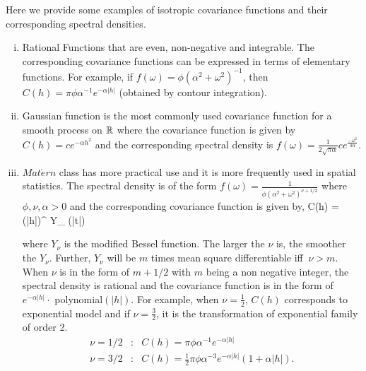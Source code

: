 Here we provide some examples of isotropic covariance functions and their corresponding spectral densities.
\begin{enumerate}[(i)]
	\item Rational Functions that are even,  non-negative and integrable. The corresponding covariance functions can be expressed in terms of elementary functions. For example, if $f(\omega) =\phi (\alpha^2+\omega^2)^{-1}$, then $C(h) = \pi\phi\alpha^{-1}e^{-\alpha|h|}$ (obtained by contour integration).
	
	\item Gaussian \cov function is the most commonly used covariance function for a smooth process on $\mathbb{R}$ where the covariance function is given by $C(h)=ce^{-\alpha h^2}$ and the corresponding spectral density is $ f(\omega) = \frac{1}{2\sqrt{\pi\alpha}}c e^{\frac{-\omega^2}{4\alpha}}$.

	
	\item $Mat\acute{e}rn$ class has more practical use and it is more frequently used in spatial statistics. The spectral density is of the form $f(\omega) =\frac{1}{\phi(\alpha^2+\omega^2)^{\nu+1/2}}$ where $\phi,\nu,\alpha>0$ and the corresponding covariance function is given by,
	      \beq
	      C(h) =  (\alpha|h|)^{\nu} Y_{\nu} (\alpha|t|)
	      \eeq
	
	      where $Y_{\nu}$ is the modified Bessel function. The larger the $\nu$ is, the smoother the $Y_{\nu}$. Further, $Y_{\nu}$ will be $m$ times mean square differentiable iff $\ \nu>m$. When $\nu$ is in the form of $m+1/2$ with $m$ being a non negative integer, the spectral density is rational and the covariance function is in the form of $e^{-\alpha|h|}\cdot$ polynomial$(|h|)$. For example, when $\nu=\frac{1}{2}$, $C(h)$ corresponds to exponential model and if $\nu=\frac{3}{2}$, it is the transformation of exponential family of order 2.
	      \begin{eqnarray*}
	      	\nu = 1/2 &:& C(h) = \pi\phi\alpha^{-1}e^{-\alpha|h|}\\
	      	\nu = 3/2 &:& C(h) = \frac{1}{2}\pi\phi\alpha^{-3}e^{-\alpha|h|}(1+\alpha|h|).\\
	      \end{eqnarray*}
\end{enumerate}	

